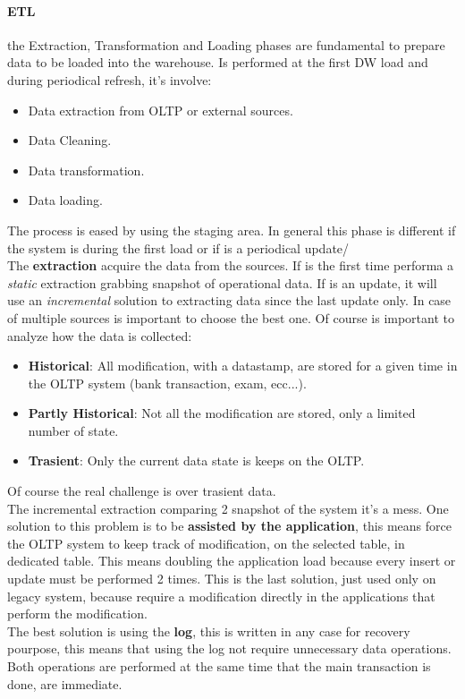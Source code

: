 \documentclass[12pt]{article}
\begin{document}
\paragraph{ETL} the Extraction, Transformation and Loading phases are fundamental to prepare data to be loaded into the warehouse. Is performed at the first DW load and during periodical refresh, it's involve:
\begin{itemize}
  \item Data extraction from OLTP or external sources.
  \item Data Cleaning.
  \item Data transformation.
  \item Data loading.
\end{itemize}
The process is eased by using the staging area. In general this phase is different if the system is during the first load or if is a periodical update/\\
The \textbf{extraction} acquire the data from the sources. If is the first time performa a \textit{static} extraction grabbing snapshot of operational data. If is an update, it will use an \textit{incremental} solution to extracting data since the last update only. In case of multiple sources is important to choose the best one. Of course is important to analyze how the data is collected:
\begin{itemize}
  \item \textbf{Historical}: All modification, with a datastamp, are stored for a given time in the OLTP system (bank transaction, exam, ecc...).
  \item \textbf{Partly Historical}: Not all the modification are stored, only a limited number of state.
  \item \textbf{Trasient}: Only the current data state is keeps on the OLTP.
\end{itemize}
Of course the real challenge is over trasient data.\\
The incremental extraction comparing 2 snapshot of the system it's a mess. One solution to this problem is to be \textbf{assisted by the application}, this means force the OLTP system to keep track of modification, on the selected table, in dedicated table. This means doubling the application load because every insert or update must be performed 2 times. This is the last solution, just used only on legacy system, because require a modification directly in the applications that perform the modification.\\
The best solution is using the \textbf{log}, this is written in any case for recovery pourpose, this means that using the log not require unnecessary data operations. Both operations are performed at the same time that the main transaction is done, are immediate.\\
\end{document}
